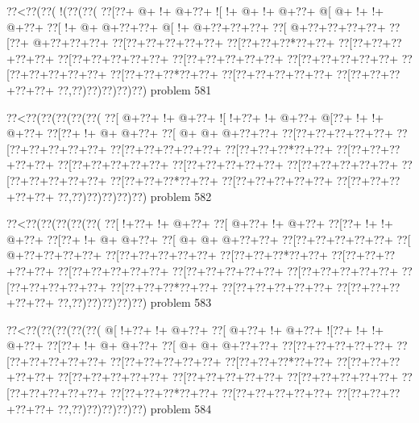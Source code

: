 \vbox{\vbox{\goo
\0??<\0??(\0??(\- !(\0??(\0??(
\0??[\0??+\- @+\- !+\- @+\0??+
\- ![\- !+\- @+\- !+\- @+\0??+
\- @[\- @+\- !+\- !+\- @+\0??+
\0??[\- !+\- @+\- @+\0??+\0??+
\- @[\- !+\- @+\0??+\0??+\0??+
\0??[\- @+\0??+\0??+\0??+\0??+
\0??[\0??+\- @+\0??+\0??+\0??+
\0??[\0??+\0??+\0??+\0??+\0??+
\0??[\0??+\0??+\0??*\0??+\0??+
\0??[\0??+\0??+\0??+\0??+\0??+
\0??[\0??+\0??+\0??+\0??+\0??+
\0??[\0??+\0??+\0??+\0??+\0??+
\0??[\0??+\0??+\0??+\0??+\0??+
\0??[\0??+\0??+\0??+\0??+\0??+
\0??[\0??+\0??+\0??*\0??+\0??+
\0??[\0??+\0??+\0??+\0??+\0??+
\0??[\0??+\0??+\0??+\0??+\0??+
\0??,\0??)\0??)\0??)\0??)\0??)
}
\hfil problem 581\hfil\break
}

\vbox{\vbox{\goo
\0??<\0??(\0??(\0??(\0??(\0??(
\0??[\- @+\0??+\- !+\- @+\0??+
\- ![\- !+\0??+\- !+\- @+\0??+
\- @[\0??+\- !+\- !+\- @+\0??+
\0??[\0??+\- !+\- @+\- @+\0??+
\0??[\- @+\- @+\- @+\0??+\0??+
\0??[\0??+\0??+\0??+\0??+\0??+
\0??[\0??+\0??+\0??+\0??+\0??+
\0??[\0??+\0??+\0??+\0??+\0??+
\0??[\0??+\0??+\0??*\0??+\0??+
\0??[\0??+\0??+\0??+\0??+\0??+
\0??[\0??+\0??+\0??+\0??+\0??+
\0??[\0??+\0??+\0??+\0??+\0??+
\0??[\0??+\0??+\0??+\0??+\0??+
\0??[\0??+\0??+\0??+\0??+\0??+
\0??[\0??+\0??+\0??*\0??+\0??+
\0??[\0??+\0??+\0??+\0??+\0??+
\0??[\0??+\0??+\0??+\0??+\0??+
\0??,\0??)\0??)\0??)\0??)\0??)
}
\hfil problem 582\hfil\break
}

\vbox{\vbox{\goo
\0??<\0??(\0??(\0??(\0??(\0??(
\0??[\- !+\0??+\- !+\- @+\0??+
\0??[\- @+\0??+\- !+\- @+\0??+
\0??[\0??+\- !+\- !+\- @+\0??+
\0??[\0??+\- !+\- @+\- @+\0??+
\0??[\- @+\- @+\- @+\0??+\0??+
\0??[\0??+\0??+\0??+\0??+\0??+
\0??[\- @+\0??+\0??+\0??+\0??+
\0??[\0??+\0??+\0??+\0??+\0??+
\0??[\0??+\0??+\0??*\0??+\0??+
\0??[\0??+\0??+\0??+\0??+\0??+
\0??[\0??+\0??+\0??+\0??+\0??+
\0??[\0??+\0??+\0??+\0??+\0??+
\0??[\0??+\0??+\0??+\0??+\0??+
\0??[\0??+\0??+\0??+\0??+\0??+
\0??[\0??+\0??+\0??*\0??+\0??+
\0??[\0??+\0??+\0??+\0??+\0??+
\0??[\0??+\0??+\0??+\0??+\0??+
\0??,\0??)\0??)\0??)\0??)\0??)
}
\hfil problem 583\hfil\break
}

\vbox{\vbox{\goo
\0??<\0??(\0??(\0??(\0??(\0??(
\- @[\- !+\0??+\- !+\- @+\0??+
\0??[\- @+\0??+\- !+\- @+\0??+
\- ![\0??+\- !+\- !+\- @+\0??+
\0??[\0??+\- !+\- @+\- @+\0??+
\0??[\- @+\- @+\- @+\0??+\0??+
\0??[\0??+\0??+\0??+\0??+\0??+
\0??[\0??+\0??+\0??+\0??+\0??+
\0??[\0??+\0??+\0??+\0??+\0??+
\0??[\0??+\0??+\0??*\0??+\0??+
\0??[\0??+\0??+\0??+\0??+\0??+
\0??[\0??+\0??+\0??+\0??+\0??+
\0??[\0??+\0??+\0??+\0??+\0??+
\0??[\0??+\0??+\0??+\0??+\0??+
\0??[\0??+\0??+\0??+\0??+\0??+
\0??[\0??+\0??+\0??*\0??+\0??+
\0??[\0??+\0??+\0??+\0??+\0??+
\0??[\0??+\0??+\0??+\0??+\0??+
\0??,\0??)\0??)\0??)\0??)\0??)
}
\hfil problem 584\hfil\break
}

